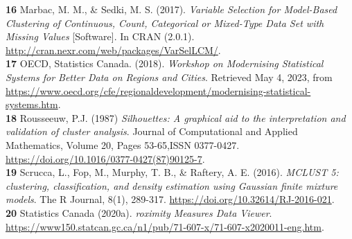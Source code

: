 \documentclass[11pt, a4paper]{article}
\begin{document}

\noindent\textbf{16} Marbac, M. M., \& Sedki, M. S. (2017). \textit{Variable Selection for Model-Based Clustering of Continuous, Count, Categorical or Mixed-Type Data Set with Missing Values} [Software]. In CRAN (2.0.1). \sloppy\url{ http://cran.nexr.com/web/packages/VarSelLCM/}. \\


\noindent\textbf{17} OECD, Statistics Canada. (2018). \textit{Workshop on Modernising Statistical Systems for Better Data on Regions and Cities}.  Retrieved May 4, 2023, from \sloppy\url{https://www.oecd.org/cfe/regionaldevelopment/modernising-statistical-systems.htm}. \\


\noindent\textbf{18} Rousseeuw, P.J. (1987) \textit{Silhouettes: A graphical aid to the interpretation and validation of cluster analysis}. Journal of Computational and Applied Mathematics, Volume 20, Pages 53-65,ISSN 0377-0427. \sloppy\url{https://doi.org/10.1016/0377-0427(87)90125-7}. \\

\noindent\textbf{19} Scrucca, L., Fop, M., Murphy, T. B., \& Raftery, A. E. (2016). \textit{MCLUST 5: clustering, classification, and density estimation using Gaussian finite mixture models}. The R Journal, 8(1), 289-317.  \sloppy\url{https://doi.org/10.32614/RJ-2016-021}. \\

\noindent\textbf{20} Statistics Canada (2020a). \textit{roximity Measures Data Viewer}. \sloppy\url{https://www150.statcan.gc.ca/n1/pub/71-607-x/71-607-x2020011-eng.htm}. \\
\end{document}
